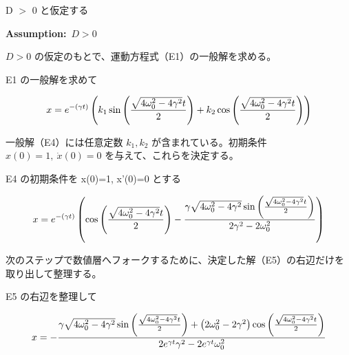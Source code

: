 \documentclass[dvipdfmx,a4paper,11pt]{jsarticle}
\begin{document}
D $>$ 0 と仮定する

\noindent\textbf{Assumption:}\ $\displaystyle D > 0$\par

$D>0$ の仮定のもとで、運動方程式（E1）の一般解を求める。

E1 の一般解を求めて

\begin{equation}
  x=e^ {- \left(\gamma t\right) } \left(k_{1} \sin \left({{\sqrt{4 \omega_{0}^2-4 \gamma^2} t}\over{2}}\right)+k_{2} \cos \left({{\sqrt{4 \omega_{0}^2-4 \gamma^2} t}\over{2}}\right)\right)
  \label{eq:E4}
\end{equation}

一般解（E4）には任意定数 $k_1,k_2$ が含まれている。初期条件 $x(0)=1,\ \dot x(0)=0$ を与えて、これらを決定する。

E4 の初期条件を x(0)=1, x'(0)=0 とする

\begin{equation}
  x = e^ {- \left(\gamma t\right) } \left(\cos \left({{\sqrt{4 \omega_{0}^2-4 \gamma^2} t}\over{2}}\right)-{{\gamma \sqrt{4 \omega_{0}^2-4 \gamma^2} \sin \left({{\sqrt{4 \omega_{0}^2-4 \gamma^2} t}\over{2}}\right)}\over{2 \gamma^2-2 \omega_{0}^2}}\right)
  \label{eq:E5}
\end{equation}

次のステップで数値層へフォークするために、決定した解（E5）の右辺だけを取り出して整理する。

E5 の右辺を整理して

\begin{equation}
  x = -{{\gamma \sqrt{4 \omega_{0}^2-4 \gamma^2} \sin \left({{\sqrt{4 \omega_{0}^2-4 \gamma^2} t}\over{2}}\right)+\left(2 \omega_{0}^2-2 \gamma^2\right) \cos \left({{\sqrt{4 \omega_{0}^2-4 \gamma^2} t}\over{2}}\right)}\over{2 e^{\gamma t} \gamma^2-2 e^{\gamma t} \omega_{0}^2}}
  \label{eq:E6}
\end{equation}
\end{document}
